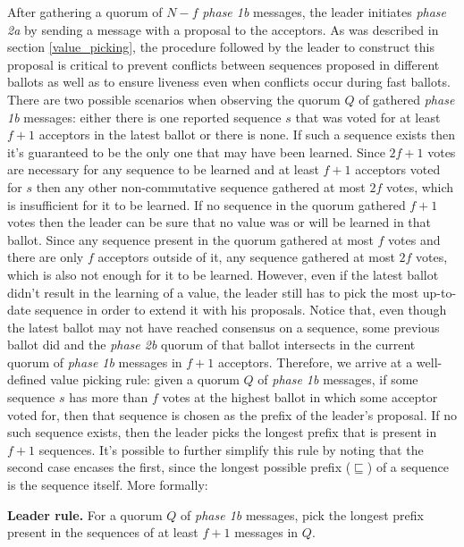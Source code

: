 After gathering a quorum of $N-f$ \textit{phase 1b} messages, the leader initiates \textit{phase 2a} by sending a message with a proposal to the acceptors. As was described in section \ref{value_picking}, the procedure followed by the leader to construct this proposal is critical to prevent conflicts between sequences proposed in different ballots as well as to ensure liveness even when conflicts occur during fast ballots. There are two possible scenarios when observing the quorum $Q$ of gathered \textit{phase 1b} messages: either there is one reported sequence $s$ that was voted for at least $f+1$ acceptors in the latest ballot or there is none. If such a sequence exists then it's guaranteed to be the only one that may have been learned. Since $2f+1$ votes are necessary for any sequence to be learned and at least $f+1$ acceptors voted for $s$ then any other non-commutative sequence gathered at most $2f$ votes, which is insufficient for it to be learned. If no sequence in the quorum gathered $f+1$ votes then the leader can be sure that no value was or will be learned in that ballot. Since any sequence present in the quorum gathered at most $f$ votes and there are only $f$ acceptors outside of it, any sequence gathered at most $2f$ votes, which is also not enough for it to be learned. However, even if the latest ballot didn't result in the learning of a value, the leader still has to pick the most up-to-date sequence in order to extend it with his proposals. Notice that, even though the latest ballot may not have reached consensus on a sequence, some previous ballot did and the \textit{phase 2b} quorum of that ballot intersects in the current quorum of \textit{phase 1b} messages in $f+1$ acceptors. Therefore, we arrive at a well-defined value picking rule: given a quorum $Q$ of \textit{phase 1b} messages, if some sequence $s$ has more than $f$ votes at the highest ballot in which some acceptor voted for, then that sequence is chosen as the prefix of the leader's proposal. If no such sequence exists, then the leader picks the longest prefix that is present in $f+1$ sequences. It's possible to further simplify this rule by noting that the second case encases the first, since the longest possible prefix ($\sqsubseteq$) of a sequence is the sequence itself. More formally:

\begin{displayquote}
\textbf{Leader rule.} For a quorum $Q$ of \textit{phase 1b} messages, pick the longest prefix present in the sequences of at least $f+1$ messages in $Q$.
\end{displayquote}

